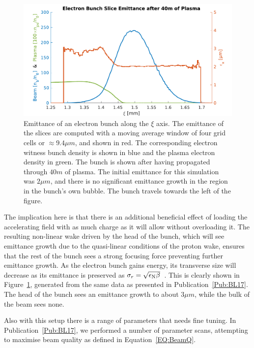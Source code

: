 \begin{figure}[hbt]
    \centering
    \includegraphics[width=0.8125\linewidth]{figures/40mSliceEmittance}
    \caption{\label{Fig:SimA:BL17Emitt}
        Emittance of an electron bunch along the $\xi$ axis.
        The emittance of the slices are computed with a moving average window of four grid cells or $\approx 9.4\unit{\mu m}$, and shown in red.
        The corresponding electron witness bunch density is shown in blue and the plasma electron density in green.
        The bunch is shown after having propagated through $40\unit{m}$ of plasma.
        The initial emittance for this simulation was $2\unit{\mu m}$, and there is no significant emittance growth in the region in the bunch's own bubble.
        The bunch travels towards the left of the figure.
    }
\end{figure}

The implication here is that there is an additional beneficial effect of loading the accelerating field with as much charge as it will allow without overloading it.
The resulting non-linear wake driven by the head of the bunch, which will see emittance growth due to the quasi-linear conditions of the proton wake, ensures that the rest of the bunch sees a strong focusing force preventing further emittance growth.
As the electron bunch gains energy, its transverse size will decrease as its emittance is preserved as $\sigma_{r} = \sqrt{\epsilon_{\mathrm{N}}\beta}$~\cite{wille:2001}.
This is clearly shown in Figure~\ref{Fig:SimA:BL17Emitt}, generated from the same data as presented in Publication~\ref{Pub:BL17}.
The head of the bunch sees an emittance growth to about $3\unit{\mu m}$, while the bulk of the beam sees none.

Also with this setup there is a range of parameters that needs fine tuning.
In Publication~\ref{Pub:BL17}, we performed a number of parameter scans, attempting to maximise beam quality as defined in Equation~\ref{EQ:BeamQ}.

